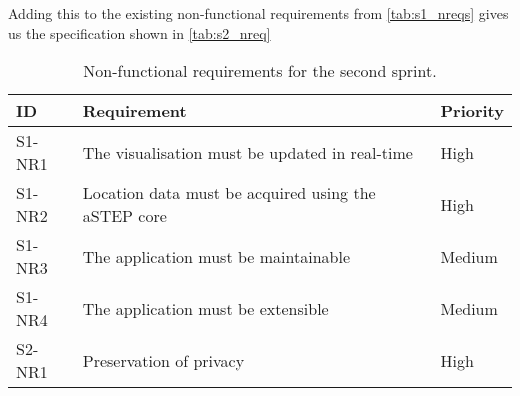 Adding this to the existing non-functional requirements from \cref{tab:s1_nreqs} gives us the specification shown in \cref{tab:s2_nreq}

\begin{table}[h!]
	\centering
	\begin{tabularx}{\textwidth}{lXl}
		\toprule
		\textbf{ID} & \textbf{Requirement} & \textbf{Priority} \\
		\midrule 
		\rowcolor[HTML]{EFEFEF} 
		S1-NR1 & The visualisation must be updated in real-time & High \\
		S1-NR2 & Location data must be acquired using the aSTEP core & High \\
		\rowcolor[HTML]{EFEFEF} 
		S1-NR3 & The application must be maintainable & Medium \\
		S1-NR4 & The application must be extensible & Medium \\
		\rowcolor[HTML]{EFEFEF}
		S2-NR1 & Preservation of privacy & High \\
		\bottomrule
	\end{tabularx}
	\caption{Non-functional requirements for the second sprint.}
	\label{tab:s2_nreqs}
\end{table}
